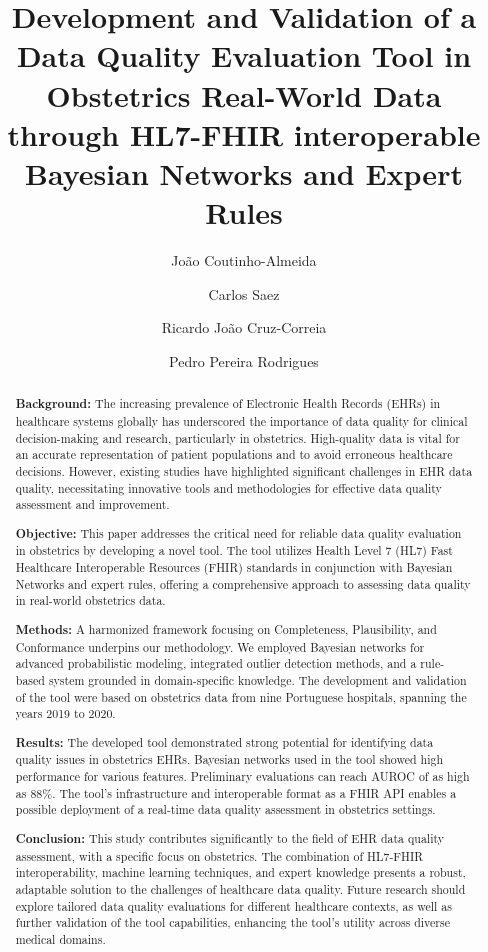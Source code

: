 \documentclass[]{article}
\title{Development and Validation of a Data Quality Evaluation Tool in Obstetrics Real-World Data through HL7-FHIR interoperable Bayesian Networks and Expert Rules}
\author[1,*]{João Coutinho-Almeida}
\author[2]{Carlos Saez}
\author[2]{Ricardo João Cruz-Correia}
\author[3]{Pedro Pereira Rodrigues}
\affil[1]{\small Department, Organization, Street, City, 100190, State, Country}
\affil[2]{Department, Organization, Street, City, 10587, State, Country}
\affil[3]{Department, Organization, Street, City, 610101, State, Country}
\affil[*]{Corresponding author: \texttt{user\_id@university.edu}}
\date{}  %
\begin{document}
\maketitle

\begin{abstract}
  \textbf{Background:} The increasing prevalence of Electronic Health Records (EHRs) in healthcare systems globally has underscored the importance of data quality for clinical decision-making and research, particularly in obstetrics. High-quality data is vital for an accurate representation of patient populations and to avoid erroneous healthcare decisions. However, existing studies have highlighted significant challenges in EHR data quality, necessitating innovative tools and methodologies for effective data quality assessment and improvement.

  \textbf{Objective:} This paper addresses the critical need for reliable data quality evaluation in obstetrics by developing a novel tool. The tool utilizes Health Level 7 (HL7) Fast Healthcare Interoperable Resources (FHIR) standards in conjunction with Bayesian Networks and expert rules, offering a comprehensive approach to assessing data quality in real-world obstetrics data.
  
  \textbf{Methods:} A harmonized framework focusing on Completeness, Plausibility, and Conformance underpins our methodology. We employed Bayesian networks for advanced probabilistic modeling, integrated outlier detection methods, and a rule-based system grounded in domain-specific knowledge. The development and validation of the tool were based on obstetrics data from nine Portuguese hospitals, spanning the years 2019 to 2020.
  
  \textbf{Results:} The developed tool demonstrated strong potential for identifying data quality issues in obstetrics EHRs. Bayesian networks used in the tool showed high performance for various features. Preliminary evaluations can reach AUROC of as high as 88\%. The tool's infrastructure and interoperable format as a FHIR API enables a possible deployment of a real-time data quality assessment in obstetrics settings. 
  
  \textbf{Conclusion:} This study contributes significantly to the field of EHR data quality assessment, with a specific focus on obstetrics. The combination of HL7-FHIR interoperability, machine learning techniques, and expert knowledge presents a robust, adaptable solution to the challenges of healthcare data quality. Future research should explore tailored data quality evaluations for different healthcare contexts, as well as further validation of the tool capabilities, enhancing the tool's utility across diverse medical domains.
\end{abstract}
\end{document}
